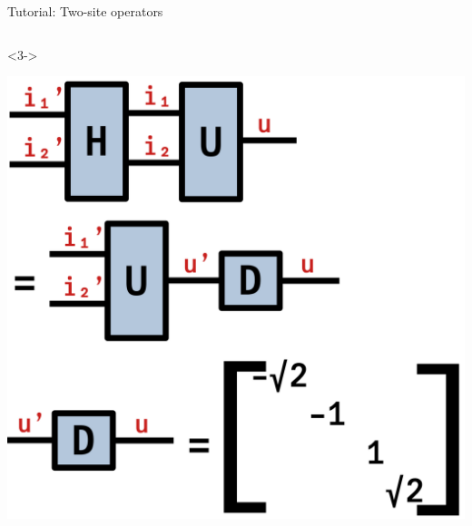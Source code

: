 \begin{frame}[fragile]{Tutorial: Two-site operators}
\begin{columns}
\begin{column}{5cm}
\begin{onlyenv}<3->
\vspace*{0.0cm}
\begin{center}
\includegraphics[width=1.0\textwidth]{
  slides/assets/eigen_H.png
}
\end{center}
\vspace*{0.0cm}
\end{onlyenv}

\end{column}

\end{columns}

\end{frame}
